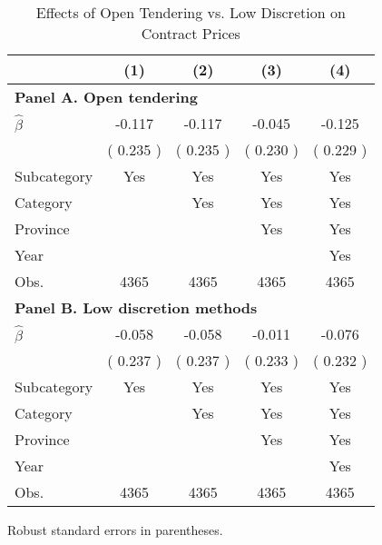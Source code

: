 \begin{table}[htbp]\centering
\caption{Effects of Open Tendering vs. Low Discretion on Contract Prices}
\label{tab:reg_fe}
\setlength{\tabcolsep}{6pt} 
\renewcommand{\arraystretch}{0.95} 
\footnotesize
\begin{tabular}{l*{4}{c}}
\hline\hline
& (1) & (2) & (3) & (4) \\
\hline
\multicolumn{5}{l}{\textbf{Panel A. Open tendering}} \\
\(\hat\beta\)     & -0.117 & -0.117 & -0.045 & -0.125 \\
 & (  0.235 ) & (  0.235 ) & (  0.230 ) & (  0.229 ) \\
Subcategory & Yes & Yes & Yes & Yes \\
Category  &  & Yes & Yes & Yes \\
Province  &  &  & Yes & Yes \\
Year  &  &  &  & Yes \\
Obs.     &   4365 &   4365 &   4365 &   4365 \\
\midrule
\multicolumn{5}{l}{\textbf{Panel B. Low discretion methods}} \\
\(\hat\beta\)     & -0.058 & -0.058 & -0.011 & -0.076 \\
 & (  0.237 ) & (  0.237 ) & (  0.233 ) & (  0.232 ) \\
Subcategory & Yes & Yes & Yes & Yes \\
Category &  & Yes & Yes & Yes \\
Province  &  &  & Yes & Yes \\
Year &  &  &  & Yes \\
Obs.     &   4365 &   4365 &   4365 &   4365 \\
\hline\hline
\end{tabular}
\begin{flushleft}\footnotesize Robust standard errors in parentheses.\end{flushleft}
\end{table}
